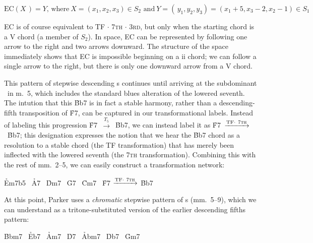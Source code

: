 \vspace{-3em}
\begin{displaymath}
  \mathrm{EC}(X\,) = Y\text{, where}\ X = (x_1, x_2, x_3) \in S_2
   \text{ and}\
  Y = (\,y_1, y_2, y_3) = (x_1 + 5, x_3 - 2, x_2 - 1) \in S_1
\end{displaymath}
\vspace{-3em}

\noindent EC is of course equivalent to TF $\cdot$ \textsc{7th} $\cdot$
\textsc{3rd}, but only when the starting chord is a V\tsup{7} chord (a member
of $S_2$). In \tf space, EC can be represented by following one arrow to the
right and two arrows downward. The structure of the space immediately shows
that EC is impossible beginning on a ii chord; we can follow a single
arrow to the right, but there is only one downward arrow from a V\tsup{7}
chord.\fn{tft-7}

This pattern of stepwise descending \tf{}s continues until arriving at the
subdominant \Bflat\ in m.~5, which includes the standard blues alteration of
the lowered seventh.\fn{tft-6} The intution that this \h{Bb7} is in fact a
stable harmony, rather than a descending-fifth transposition of \h{F7}, can be
captured in our transformational labels. Instead of labeling this progression
\mbox{\h{F7} $\xrightarrow{T_5}$ \h{Bb7}}, we can instead label it as
\mbox{\h{F7} $\xrightarrow{\mathrm{TF} \cdot\ \text{\textsc{7th}}}$ \h{Bb7}};
this designation expresses the notion that we hear the \h{Bb7} chord as a
resolution to a stable chord (the TF transformation) that has merely been
inflected with the lowered seventh (the \textsc{7th} transformation).
Combining this with the rest of mm.~2--5, we can easily construct a
transformation network:

\begin{center}
  \h{Em7b5} \TFarrow\ \h{A7} \ECarrow\
  \h{Dm7}   \TFarrow\ \h{G7} \ECarrow\
  \h{Cm7}   \TFarrow\ \h{F7} $\xrightarrow{\mathrm{TF} \cdot\ \text{\textsc{7th}}}$
  \h{Bb7}
\end{center}


At this point, Parker uses a \emph{chromatic} stepwise pattern of \tf{}s
(mm.~5--9), which we can understand as a tritone-substituted version of the
earlier descending fifths pattern:

\begin{center}
  \h{Bbm7} \TFTarrow\ \h{Eb7} \ECTarrow\
  \h{Am7}  \TFTarrow\ \h{D7}   \ECTarrow\
  \h{Abm7} \TFTarrow\ \h{Db7} \ECTarrow\
  \h{Gm7}
\end{center}

